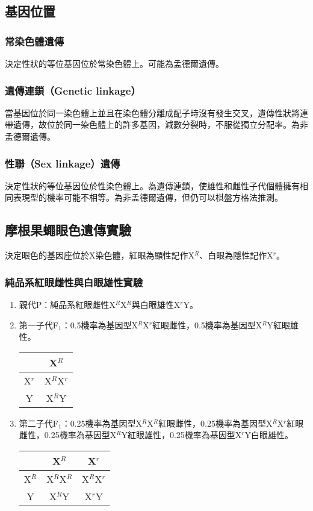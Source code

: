 \documentclass[a4paper,12pt]{report}
\begin{document}
\subsection{基因位置}
\subsubsection{常染色體遺傳}
決定性狀的等位基因位於常染色體上。可能為孟德爾遺傳。
\subsubsection{遺傳連鎖（Genetic linkage）}
當基因位於同一染色體上並且在染色體分離成配子時沒有發生交叉，遺傳性狀將連帶遺傳，故位於同一染色體上的許多基因，減數分裂時，不服從獨立分配率。為非孟德爾遺傳。
\subsubsection{性聯（Sex linkage）遺傳}
決定性狀的等位基因位於性染色體上。為遺傳連鎖，使雄性和雌性子代個體擁有相同表現型的機率可能不相等。為非孟德爾遺傳，但仍可以棋盤方格法推測。
\subsection{摩根果蠅眼色遺傳實驗}
決定眼色的基因座位於X染色體，紅眼為顯性記作Χ$^R$、白眼為隱性記作X$^r$。
\subsubsection{純品系紅眼雌性與白眼雄性實驗}
\begin{enumerate}
\item 親代P：純品系紅眼雌性X$^R$X$^R$與白眼雄性X$^r$Y。
\item 第一子代F$_1$：0.5機率為基因型X$^R$X$^r$紅眼雌性，0.5機率為基因型X$^R$Y紅眼雄性。
\begin{center}
\begin{tabular}{|c|c|}
\hline
& X$^R$ \\ \hline
X$^r$ & X$^R$X$^r$ \\ \hline
Y & X$^R$Y \\ \hline
\end{tabular}
\end{center}
\item 第二子代F$_1$：0.25機率為基因型X$^R$X$^R$紅眼雌性，0.25機率為基因型X$^R$X$^r$紅眼雌性，0.25機率為基因型X$^R$Y紅眼雄性，0.25機率為基因型X$^r$Y白眼雄性。
\begin{center}
\begin{tabular}{|c|c|c|}
\hline
& X$^R$ & X$^r$ \\ \hline
X$^R$ & X$^R$X$^R$ & X$^R$X$^r$ \\ \hline
Y & X$^R$Y & X$^r$Y \\ \hline
\end{tabular}
\end{center}
\end{enumerate}
\end{document}
